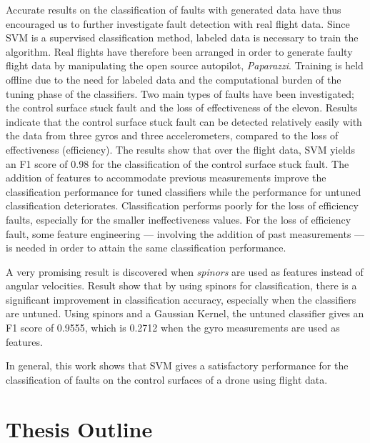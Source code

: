 Accurate results on the classification of faults with generated data have thus encouraged us to further investigate fault detection with real flight data. 
Since SVM is a supervised classification method, labeled data is necessary to train the algorithm. Real flights have therefore been arranged in order to generate faulty flight data by manipulating the open source autopilot, \emph{Paparazzi}.  
Training is held offline due to the need for labeled data and the computational burden of the tuning phase of the classifiers. 
Two main types of faults have been investigated; the control surface stuck fault and the loss of effectiveness of the elevon. Results indicate that the control surface stuck fault can be detected relatively easily with the data from three gyros and three accelerometers, compared to the loss of effectiveness (efficiency). 
The results show that over the flight data, SVM yields an F1 score of 0.98 for the classification of the control surface stuck fault. 
The addition of features to accommodate previous measurements improve the classification performance for tuned classifiers while the performance for untuned classification deteriorates. 
Classification performs poorly for the loss of efficiency faults, especially for the smaller ineffectiveness values. 
For the loss of efficiency fault, some feature engineering --- involving the addition of past measurements --- is needed in order to attain the same classification performance.

A very promising result is discovered when \emph{spinors} are used as features instead of angular velocities. 
Result show that by using spinors for classification, there is a significant improvement in classification accuracy, especially when the classifiers are untuned. Using spinors and a Gaussian Kernel, the untuned classifier gives an F1 score of 0.9555, which is 0.2712 when the gyro measurements are used as features.

In general, this work shows that SVM gives a satisfactory performance for the classification of faults on the control surfaces of a drone using flight data.

\section{Thesis Outline}

